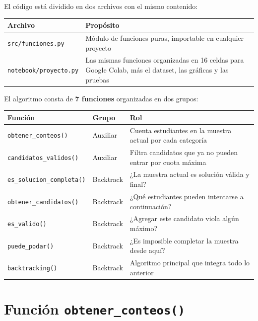 \documentclass[11pt, a4paper]{article}
\begin{document}
El código está dividido en dos archivos con el mismo contenido:

\begin{center}
\begin{tabular}{lp{8cm}}
  \toprule
  \textbf{Archivo} & \textbf{Propósito} \\
  \midrule
  \texttt{src/funciones.py}    & Módulo de funciones puras, importable en cualquier proyecto \\
  \texttt{notebook/proyecto.py} & Las mismas funciones organizadas en 16 celdas para Google Colab, más el dataset, las gráficas y las pruebas \\
  \bottomrule
\end{tabular}
\end{center}

El algoritmo consta de \textbf{7 funciones} organizadas en dos grupos:

\begin{center}
\begin{tabular}{llp{7cm}}
  \toprule
  \textbf{Función} & \textbf{Grupo} & \textbf{Rol} \\
  \midrule
  \texttt{obtener\_conteos()}        & Auxiliar   & Cuenta estudiantes en la muestra actual por cada categoría \\
  \texttt{candidatos\_validos()}     & Auxiliar   & Filtra candidatos que ya no pueden entrar por cuota máxima \\
  \texttt{es\_solucion\_completa()}  & Backtrack  & ¿La muestra actual es solución válida y final? \\
  \texttt{obtener\_candidatos()}     & Backtrack  & ¿Qué estudiantes pueden intentarse a continuación? \\
  \texttt{es\_valido()}             & Backtrack  & ¿Agregar este candidato viola algún máximo? \\
  \texttt{puede\_podar()}           & Backtrack  & ¿Es imposible completar la muestra desde aquí? \\
  \texttt{backtracking()}           & Backtrack  & Algoritmo principal que integra todo lo anterior \\
  \bottomrule
\end{tabular}
\end{center}

\section{Función \texttt{obtener\_conteos()}}
\end{document}
